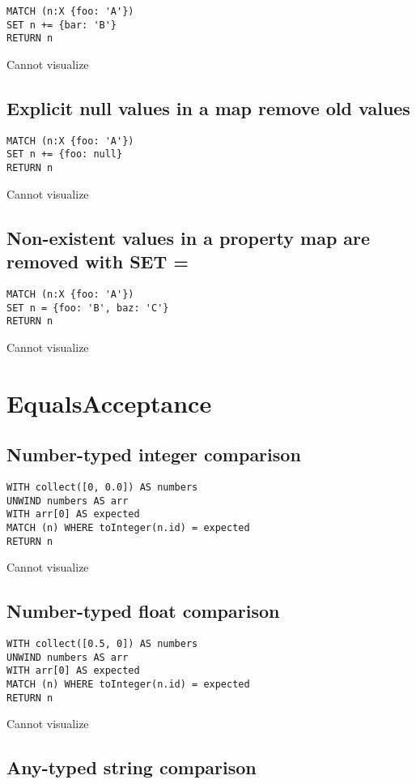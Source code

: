 \begin{lstlisting}
MATCH (n:X {foo: 'A'})
SET n += {bar: 'B'}
RETURN n
\end{lstlisting}

Cannot visualize
\subsection{Explicit null values in a map remove old values}

\begin{lstlisting}
MATCH (n:X {foo: 'A'})
SET n += {foo: null}
RETURN n
\end{lstlisting}

Cannot visualize
\subsection{Non-existent values in a property map are removed with SET =}

\begin{lstlisting}
MATCH (n:X {foo: 'A'})
SET n = {foo: 'B', baz: 'C'}
RETURN n
\end{lstlisting}

Cannot visualize
\section{EqualsAcceptance}

\subsection{Number-typed integer comparison}

\begin{lstlisting}
WITH collect([0, 0.0]) AS numbers
UNWIND numbers AS arr
WITH arr[0] AS expected
MATCH (n) WHERE toInteger(n.id) = expected
RETURN n
\end{lstlisting}

Cannot visualize
\subsection{Number-typed float comparison}

\begin{lstlisting}
WITH collect([0.5, 0]) AS numbers
UNWIND numbers AS arr
WITH arr[0] AS expected
MATCH (n) WHERE toInteger(n.id) = expected
RETURN n
\end{lstlisting}

Cannot visualize
\subsection{Any-typed string comparison}

